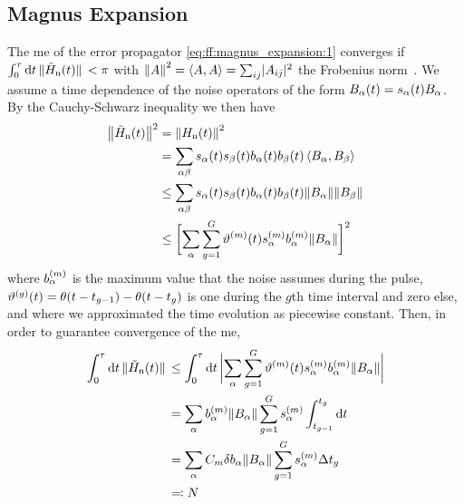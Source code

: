 \subsection{Magnus Expansion}\label{subsec:app:ff:convergence:magnus_expansion}
The \gls{me} of the error propagator \cref{eq:ff:magnus_expansion:1} converges if $\int_0^\tau\dd{t}\norm*{\tilde{H}_{\mathrm{n}}(t)} < \pi$ with $\norm{A}^2 = \expval{A,A} = \sum_{ij}\lvert A_{ij}\rvert^2$ the Frobenius norm~\cite{Moan1999}.
We assume a time dependence of the noise operators of the form $B_\alpha(t) = s_\alpha(t)B_\alpha$.
By the Cauchy-Schwarz inequality we then have
\begin{equation}
    \begin{split}
        \bigl\lVert\tilde{H}_{\mathrm{n}}(t)\bigr\rVert^2 &= \norm{H_{\mathrm{n}}(t)}^2 \\
                          &= \sum_{\alpha\beta} s_\alpha(t) s_{\beta}(t) b_\alpha(t) b_{\beta}(t)\expval{B_\alpha,B_{\beta}} \\
                          &\leq\sum_{\alpha\beta} s_\alpha(t) s_{\beta}(t) b_\alpha(t) b_{\beta}(t)
                             \norm{B_\alpha}\norm{B_{\beta}} \\
                          &\leq\biggl[\sum_{\alpha}\sum_{g=1}^{G}\vartheta^{(m)}(t)
                             s_\alpha^{(m)} b_\alpha^{(m)}\norm{B_\alpha}\biggr]^2
    \end{split}
\end{equation}
where $b_{\alpha}^{(m)}$ is the maximum value that the noise assumes during the pulse, $\vartheta^{(g)}(t) = \theta(t - t_{g-1}) - \theta(t - t_g)$ is one during the $g$th time interval and zero else, and where we approximated the time evolution as piecewise constant.
Then, in order to guarantee convergence of the \gls{me},
\begin{equation}
    \begin{split}
        \int_0^{\tau}\dd{t}\norm*{\Hnt(t)} &\leq\int_0^\tau\dd{t}\abs\bigg{\sum_{\alpha}\sum_{g=1}^{G}
                                              \vartheta\gth{m}(t) s_\alpha\gth{m} b_\alpha\gth{m}\norm{B_\alpha}} \\
                                           &= \sum_{\alpha} b_\alpha\gth{m}\norm{B_\alpha}\sum_{g=1}^{G}s_\alpha\gth{m}
                                              \int_{t_{g-1}}^{t_{g}}\dd{t} \\
                                           &= \sum_{\alpha} C_m\delta b_\alpha\norm{B_\alpha}\sum_{g=1}^{G}
                                              s_\alpha\gth{m}\Delta t_g \\
                                           &\eqqcolon N
    \end{split}
\end{equation}
